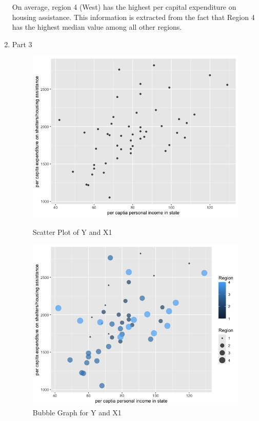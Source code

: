 \documentclass[12pt,letterpaper]{article}
\begin{document}
\begin{enumerate}
    On average, region 4 (West) has the highest per capital expenditure on housing assistance. This information is extracted from the fact that Region 4 has the highest median value among all other regions. 

    \newpage

    \item Part 3

     \begin{figure}[h]
     \centering
       \begin{minipage}{.5\textwidth}
         \centering
           \includegraphics[width=\textwidth]{images/question3_part1.png}
          \caption{Scatter Plot of Y and X1}
     \end{minipage}%
    \begin{minipage}{.45\textwidth}
       \centering
        \includegraphics[width=\textwidth]{images/question3_part2.png}
         \caption{Bubble Graph for Y and X1}
       \end{minipage}
      \end{figure}


\end{enumerate}
\end{document}

